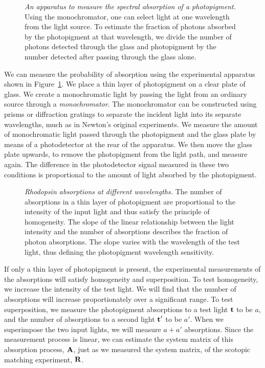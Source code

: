 \begin{figure}
\centerline {
}
\caption[Photopigment Measurement]{
{\em An apparatus to measure the spectral absorption
of a photopigment.}
Using the monochromator, one can select
light at one wavelength from the light source.
To estimate the fraction of photons absorbed by the photopigment
at that wavelength,
we divide the number of photons detected through the
glass and photopigment by
the number detected after passing through the glass alone.
}
\label{f3:self.screening}
\end{figure}
We can measure the probability of absorption
using the experimental apparatus
shown in Figure~\ref{f3:self.screening}.
We place a thin layer of photopigment on a clear plate of glass.
We create a monochromatic light
by passing the light from an ordinary source
through a {\em monochromator}.
The monochromator can be constructed using prisms or
diffraction gratings to separate the incident light
into its separate wavelengths, much as in Newton's original experiments.
We measure the amount of monochromatic light
passed through the photopigment and the glass plate
by means of a photodetector at the rear of the apparatus.
We then move the glass plate upwards,
to remove the photopigment from the light path,
and measure again.
The difference in the photodetector signal measured
in these two conditions
is proportional to the amount of light absorbed by the photopigment.

\begin{figure}
\centerline {
}
\caption[Photopigment Homogeneity]{
{\em Rhodopsin absorptions at different wavelengths.}
The number of absorptions in a thin layer of
photopigment are proportional to the intensity of the input light
and thus satisfy the principle of homogeneity.
The slope of the linear relationship between the
light intensity and the number of absorptions describes
the fraction of photon absorptions.
The slope varies with the wavelength of the test light,
thus defining the photopigment wavelength sensitivity.
}
\label{f3:scot.homogeneity}
\end{figure}
If only a thin layer of photopigment is present,
the experimental measurements of the
absorptions will satisfy homogeneity and superposition.
To test homogeneity, we increase the intensity of the test light.
We will find that the number of absorptions will increase proportionately
over a significant range.
To test superposition, we measure the
photopigment absorptions to a test light
$\mbox{${\bf t}$}$ to be $a$, 
and the number of absorptions to a second
light $\mbox{${\bf t}$} '$  to be $a'$.
When we superimpose the two input lights,
we will measure $ a + a'$ absorptions.
Since the measurement process is linear,
we can estimate the system matrix of
this absorption process, $\mbox{$\bf A$}$,
just as we measured the system matrix,
of the scotopic matching experiment, $\mbox{$\bf R$}$.

